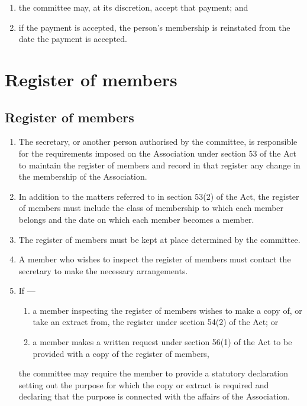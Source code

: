 \documentclass[../constitution.tex]{subfiles}
\begin{document}
\begin{enumerate}
  \begin{enumerate}
  
  \item the committee may, at its discretion, accept that payment; and
  \item if the payment is accepted, the person's membership is reinstated from the date the payment is accepted.
  \end{enumerate}
\end{enumerate}

\hypertarget{division-3-register-of-members}{%
\section{Register of members}\label{division-3-register-of-members}}

\hypertarget{register-of-members}{%
\subsection{Register of members}\label{register-of-members}}

\begin{enumerate}

\item The secretary, or another person authorised by the committee, is responsible for the requirements imposed on the Association under section 53 of the Act to maintain the register of members and record in that register any change in the membership of the Association.
\item In addition to the matters referred to in section 53(2) of the Act, the register of members must include the class of membership  to which each member belongs and the date on which each member becomes a member.
\item The register of members must be kept at  place determined by the committee.
\item A member who wishes to inspect the register of members must contact the secretary to make the necessary arrangements.
\item If ---

  \begin{enumerate}
  \item a member inspecting the register of members wishes to make a copy of, or take an extract from, the register under section 54(2) of the Act; or
  \item a member makes a written request under section 56(1) of the Act to be provided with a copy of the register of members,

  \end{enumerate}
  the committee may require the member to provide a statutory declaration setting out the purpose for which the copy or extract is required and declaring that the purpose is connected with the affairs of the Association.
\end{enumerate}
\end{document}
